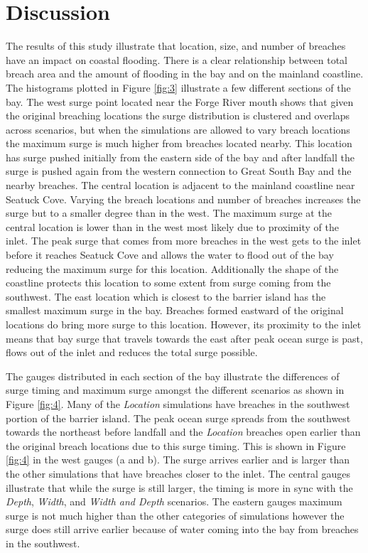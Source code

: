 \documentclass{coastal_paper}
\begin{document}
\section{Discussion}
The results of this study illustrate that location, size, and number of breaches have an impact on coastal flooding. There is a clear relationship between total breach area and the amount of flooding in the bay and on the mainland coastline. The histograms plotted in Figure \ref{fig:3} illustrate a few different sections of the bay. The west surge point located near the Forge River mouth shows that given the original breaching locations the surge distribution is clustered and overlaps across scenarios, but when the simulations are allowed to vary breach locations the maximum surge is much higher from breaches located nearby. This location has surge pushed initially from the eastern side of the bay and after landfall the surge is pushed again from the western connection to Great South Bay and the nearby breaches. The central location is adjacent to the mainland coastline near Seatuck Cove. Varying the breach locations and number of breaches increases the surge but to a smaller degree than in the west. The maximum surge at the central location is lower than in the west most likely due to proximity of the inlet. The peak surge that comes from more breaches in the west gets to the inlet before it reaches Seatuck Cove and allows the water to flood out of the bay reducing the maximum surge for this location. Additionally the shape of the coastline protects this location to some extent from surge coming from the southwest. The east location which is closest to the barrier island has the smallest maximum surge in the bay. Breaches formed eastward of the original locations do bring more surge to this location. However, its proximity to the inlet means that bay surge that travels towards the east after peak ocean surge is past, flows out of the inlet and reduces the total surge possible.

The gauges distributed in each section of the bay illustrate the differences of surge timing and maximum surge amongst the different scenarios as shown in Figure \ref{fig:4}. Many of the \emph{Location} simulations have breaches in the southwest portion of the barrier island. The peak ocean surge spreads from the southwest towards the northeast before landfall and the \emph{Location} breaches open earlier than the original breach locations due to this surge timing. This is shown in Figure \ref{fig:4} in the west gauges (a and b). The surge arrives earlier and is larger than the other simulations that have breaches closer to the inlet. The central gauges illustrate that while the surge is still larger, the timing is more in sync with the \emph{Depth}, \emph{Width}, and \emph{Width and Depth} scenarios. The eastern gauges maximum surge is not much higher than the other categories of simulations however the surge does still arrive earlier because of water coming into the bay from breaches in the southwest.
\end{document}
